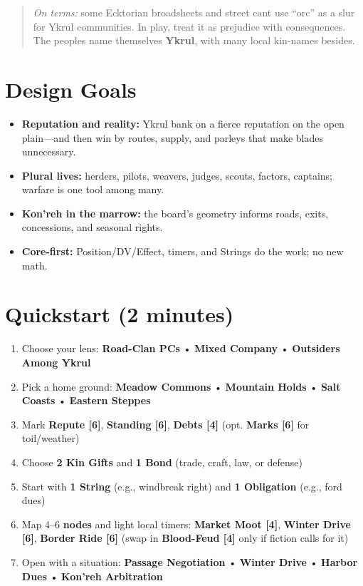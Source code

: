 \documentclass[11pt,letterpaper]{article}
\newcommand{\timer}[2]{\textbf{#1 [#2]}}
\begin{document}



\begin{quote}\footnotesize
\emph{On terms:} some Ecktorian broadsheets and street cant use ``orc'' as a slur for Ykrul communities. In play, treat it as prejudice with consequences. The peoples name themselves \textbf{Ykrul}, with many local kin-names besides.
\end{quote}

\vspace{-0.5em}
\section*{Design Goals}
\begin{itemize}[leftmargin=*]
  \item \textbf{Reputation and reality:} Ykrul bank on a fierce reputation on the open plain---and then win by routes, supply, and parleys that make blades unnecessary.
  \item \textbf{Plural lives:} herders, pilots, weavers, judges, scouts, factors, captains; warfare is one tool among many.
  \item \textbf{Kon'reh in the marrow:} the board's geometry informs roads, exits, concessions, and seasonal rights.
  \item \textbf{Core-first:} Position/DV/Effect, timers, and Strings do the work; no new math.
\end{itemize}

\section*{Quickstart (2 minutes)}
\begin{enumerate}
  \item Choose your lens: \textbf{Road-Clan PCs} • \textbf{Mixed Company} • \textbf{Outsiders Among Ykrul}
  \item Pick a home ground: \textbf{Meadow Commons} • \textbf{Mountain Holds} • \textbf{Salt Coasts} • \textbf{Eastern Steppes}
  \item Mark \textbf{Repute [6]}, \textbf{Standing [6]}, \textbf{Debts [4]} (opt. \textbf{Marks [6]} for toil/weather)
  \item Choose \textbf{2 Kin Gifts} and \textbf{1 Bond} (trade, craft, law, or defense)
  \item Start with \textbf{1 String} (e.g., windbreak right) and \textbf{1 Obligation} (e.g., ford dues)
  \item Map 4--6 \textbf{nodes} and light local timers: \timer{Market Moot}{4}, \timer{Winter Drive}{6}, \timer{Border Ride}{6} (swap in \timer{Blood-Feud}{4} only if fiction calls for it)
  \item Open with a situation: \textbf{Passage Negotiation} • \textbf{Winter Drive} • \textbf{Harbor Dues} • \textbf{Kon'reh Arbitration}
\end{enumerate}
\end{document}
